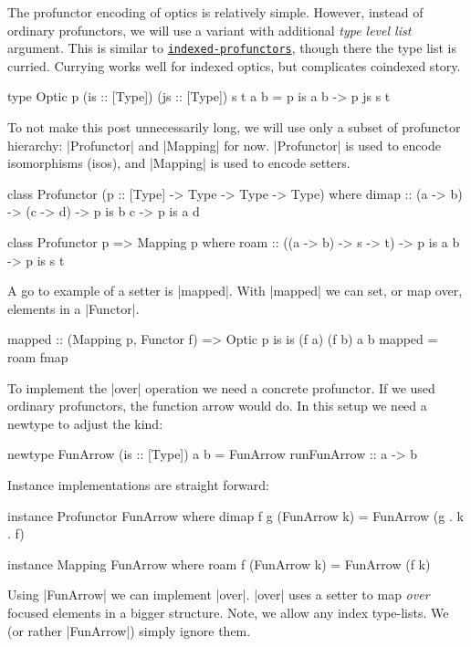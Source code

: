 The profunctor encoding of optics is relatively simple.
However, instead of ordinary profunctors, we will
use a variant with additional \emph{type level list} argument.
This is similar to
\href{https://hackage.haskell.org/package/indexed-profunctors}{\texttt{indexed-profunctors}},
though there the type list is curried.
Currying works well for indexed optics, but complicates coindexed story.

\begin{code}
type Optic p (is :: [Type]) (js :: [Type]) s t a b = p is a b -> p js s t
\end{code}

To not make this post unnecessarily long,
we will use only a subset of profunctor hierarchy: |Profunctor| and |Mapping| for now.
|Profunctor| is used to encode isomorphisms (isos),
and |Mapping| is used to encode setters.

\begin{code}
class Profunctor (p :: [Type] -> Type -> Type -> Type) where
    dimap :: (a -> b) -> (c -> d) -> p is b c -> p is a d

class Profunctor p => Mapping p where
    roam :: ((a -> b) -> s -> t) -> p is a b -> p is s t
\end{code}

A go to example of a setter is |mapped|.
With |mapped| we can set, or map over, elements in a |Functor|.

\begin{code}
mapped :: (Mapping p, Functor f)
       => Optic p is is (f a) (f b) a b
mapped = roam fmap
\end{code}

To implement the |over| operation we need a concrete profunctor.
If we used ordinary profunctors, the function arrow would do.
In this setup we need a newtype to adjust the kind:

\begin{code}
newtype FunArrow (is :: [Type]) a b =
    FunArrow { runFunArrow :: a  -> b }
\end{code}

Instance implementations are straight forward:

\begin{code}
instance Profunctor FunArrow where
    dimap f g (FunArrow k) = FunArrow (g . k . f)

instance Mapping FunArrow where
    roam f (FunArrow k) = FunArrow (f k)
\end{code}

Using |FunArrow| we can implement |over|.
|over| uses a setter to map \emph{over} focused elements in a bigger structure.
Note, we allow any index type-lists.
We (or rather |FunArrow|) simply ignore them.

